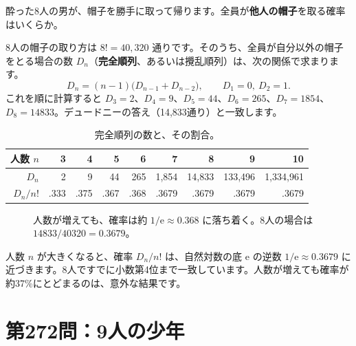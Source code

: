 \documentclass[a4paper,11pt,openany]{ltjsbook}
\newcommand{\ee}{\mathrm{e}}
\begin{document}
酔った8人の男が、帽子を勝手に取って帰ります。全員が\textbf{他人の帽子}を取る確率はいくらか。

8人の帽子の取り方は $8!=40{,}320$ 通りです。そのうち、全員が自分以外の帽子をとる場合の数 $D_n$（\textbf{完全順列}、あるいは攪乱順列）は、次の関係で求まります。
\[
D_n=(n-1)\bigl(D_{n-1}+D_{n-2}\bigr),\qquad D_1=0,\ D_2=1 .
\]
これを順に計算すると $D_3=2$、$D_4=9$、$D_5=44$、$D_6=265$、$D_7=1854$、$D_8=14833$。デュードニーの答え（14,833通り）と一致します。

\begin{table}[htbp]
\centering
\begin{tabular}{r|rrrrrrrr}
\toprule
人数 $n$ & 3 & 4 & 5 & 6 & 7 & 8 & 9 & 10\\
\midrule
$D_n$ & 2 & 9 & 44 & 265 & 1,854 & 14,833 & 133,496 & 1,334,961\\
$D_n/n!$ & .333 & .375 & .367 & .368 & .3679 & .3679 & .3679 & .3679\\
\bottomrule
\end{tabular}
\caption{完全順列の数と、その割合。}
\end{table}

\begin{figure}[htbp]
\centering
{}
\caption{人数が増えても、確率は約 $1/\ee\approx0.368$ に落ち着く。8人の場合は $14833/40320=0.3679$。}
\end{figure}

人数 $n$ が大きくなると、確率 $D_n/n!$ は、自然対数の底 $\ee$ の逆数 $1/\ee\approx0.3679$ に近づきます。8人ですでに小数第4位まで一致しています。人数が増えても確率が約37\%にとどまるのは、意外な結果です。

\section{第272問：9人の少年}
\end{document}
